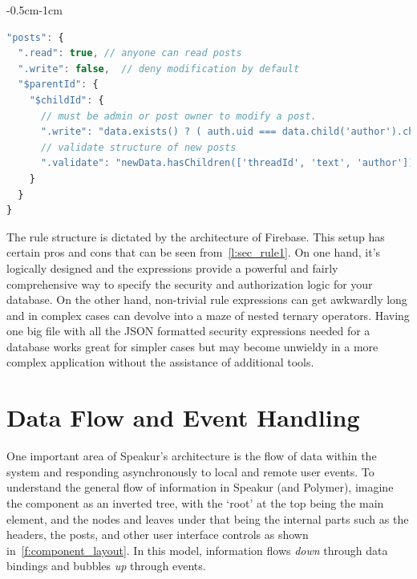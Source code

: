 \begin{changemargin}{-0.5cm}{-1cm}
\begin{lstlisting}[language=JavaScript,caption=
{Security rules for the \tcode{posts} table (user messages).},label=l:sec_rule1,captionpos=below]
"posts": {
  ".read": true, // anyone can read posts
  ".write": false,  // deny modification by default
  "$parentId": {
    "$childId": {
      // must be admin or post owner to modify a post.
      ".write": "data.exists() ? ( auth.uid === data.child('author').child('uid').val() || root.child('admins').child(auth.uid).child('scope').val() === '*' ) : true",
      // validate structure of new posts
      ".validate": "newData.hasChildren(['threadId', 'text', 'author']) && newData.child('timestamp').val() > 1"
    }
  }
}
\end{lstlisting}
\end{changemargin}

The rule structure is dictated by the architecture of Firebase.
This setup has certain pros and cons that can be seen from~\cref{l:sec_rule1}. 
On one hand, it's logically designed and the expressions provide a powerful and fairly comprehensive way to specify the 
security and authorization logic for your database.
On the other hand, non-trivial rule expressions can get awkwardly long and in complex cases can devolve into a maze of nested ternary operators.
Having one big file with all the JSON formatted security expressions needed for a database works great for simpler cases but may become unwieldy in a more complex application without the assistance of additional tools.


\section{Data Flow and Event Handling}
One important area of Speakur's architecture is the flow of data within the system and responding asynchronously to local and remote user events.
To understand the general flow of information in Speakur (and Polymer), imagine the component as an inverted tree, with the `root' at the top being the main  element, 
and the nodes and leaves under that being the internal parts such as the headers, the posts, and other user interface controls as shown in~\cref{f:component_layout}.
In this model, information flows \textit{down} through data bindings and bubbles \textit{up} through events.

